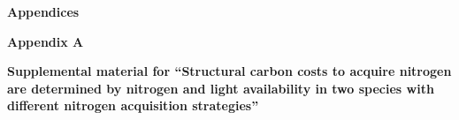 \newpage
{}

\begin{center}
    \noindent \textbf{Appendices}
\end{center}
\begin{center}
    \noindent \textbf{Appendix A}
\end{center}
\begin{center}
    \begin{singlespace}
        \textbf{Supplemental material for ``Structural carbon costs to acquire nitrogen are determined by nitrogen and light availability in two species with different nitrogen acquisition strategies''}
    \end{singlespace}
\end{center}


\setcounter{table}{0}
\renewcommand{\thetable}{A\arabic{table}}

\setcounter{figure}{0}
\renewcommand{\thefigure}{A\arabic{figure}}

